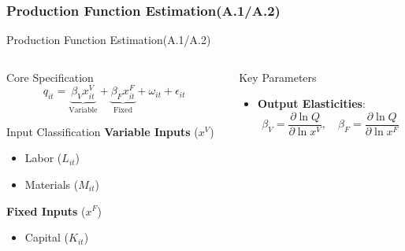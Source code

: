 \documentclass[aspectratio=169]{beamer}  %
\begin{document}
\subsubsection{Production Function Estimation(A.1/A.2)}
\begin{frame}{Production Function Estimation(A.1/A.2)}
\vspace{-0.3cm}
\begin{columns}[T]
    \begin{column}{0.48\textwidth}
        \begin{block}{Core Specification}
            \vspace{-0.2cm}
            \begin{equation*}
                q_{it} = \underbrace{\beta_V x_{it}^V}_{\text{Variable}} + \underbrace{\beta_F x_{it}^F}_{\text{Fixed}} + \omega_{it} + \epsilon_{it}
            \end{equation*}
        \end{block}
        
        \begin{exampleblock}{Input Classification}
            \textbf{Variable Inputs} (\(x^V\))
            \begin{itemize}\setlength\itemsep{0.2em}
                \item Labor (\(L_{it}\))
                \item Materials (\(M_{it}\))
            \end{itemize}
            
            \textbf{Fixed Inputs} (\(x^F\))
            \begin{itemize}\setlength\itemsep{0.2em}
                \item Capital (\(K_{it}\))
            \end{itemize}
        \end{exampleblock}
    \end{column}
    
    \begin{column}{0.48\textwidth}
        \begin{alertblock}{Key Parameters}
            \begin{itemize}
                \item \textbf{Output Elasticities}:
                \begin{equation*}
                    \beta_V = \frac{\partial \ln Q}{\partial \ln x^V}, \quad
                    \beta_F = \frac{\partial \ln Q}{\partial \ln x^F}
                \end{equation*}
                

\end{itemize}
\end{alertblock}
\end{column}
\end{columns}
\end{frame}
\end{document}
